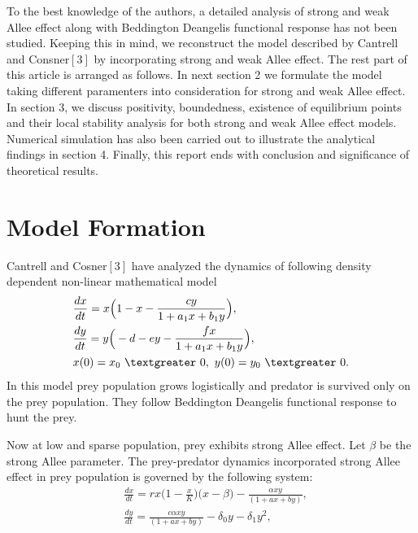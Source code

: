 \documentclass[a4paper, 10pt]{article}
\begin{document}
	To the best knowledge of the authors, a detailed analysis of strong and weak Allee effect along with Beddington Deangelis functional response has not been studied. Keeping this in mind, we reconstruct the model described by Cantrell and Consner$[3]$  by incorporating strong and weak Allee effect. The rest part of this article is arranged as follows. In next section 2 we formulate the model taking different paramenters into consideration for strong and weak Allee effect. In section 3, we discuss positivity, boundedness, existence of equilibrium points and their local stability analysis for both strong and weak Allee effect models. Numerical simulation has also been carried out to illustrate the analytical findings in section 4. Finally, this report ends with conclusion and significance of theoretical results.
	
		\section{Model Formation}
	Cantrell and Cosner$[3]$ have analyzed the dynamics of following density dependent non-linear mathematical model
	\begin{equation}
	\begin{split}
	&\frac{dx}{dt}=x\Big(1-x-\frac{cy}{1+a_1x+b_1y}\Big),\\
	&\frac{dy}{dt}=y\Big(-d-ey-\frac{fx}{1+a_1x+b_1y}\Big),\\
	&x(0)=x_0~\textgreater~0,~y(0)=y_0~\textgreater~0.
	\end{split}
	\end{equation}
	In this model prey population grows logistically and predator is survived only on the prey population. They follow Beddington Deangelis functional response to hunt the prey. \par
	Now at low and sparse population, prey exhibits strong Allee effect. Let $\beta$ be the strong Allee parameter. The prey-predator dynamics incorporated strong Allee effect in prey population is governed by the following system:
	\begin{equation}
	\begin{split}
	&\frac{dx}{dt}=rx\big(1-\frac{x}{K}\big)\Big(x-\beta\Big)-\frac{\alpha xy}{(1+ax+by)},\\
	&\frac{dy}{dt}=\frac{c\alpha xy}{(1+ax+by)}-\delta_0 y-\delta_1 y^2,
	\end{split}
	\end{equation} 
	
\end{document}
